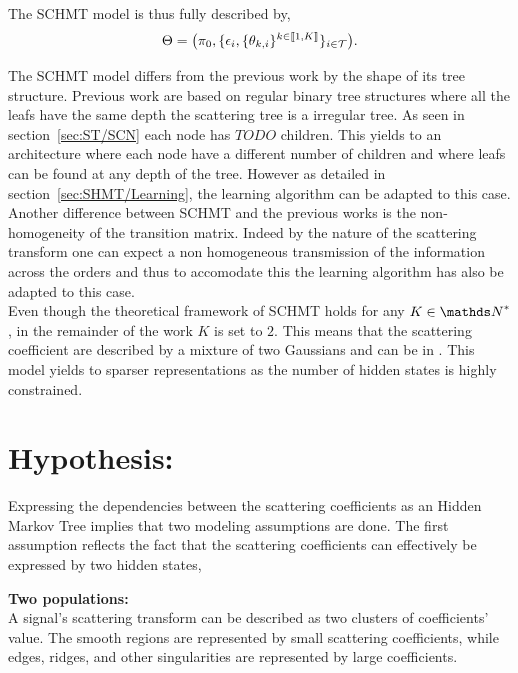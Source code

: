 \documentclass[a4paper,11pt]{report}
\begin{document}
{		The SCHMT model is thus fully described by,
		\begin{equation}
			\Theta = \big(\pi_{0}, \{ \epsilon_{i}, \{ \theta_{k,i} \}^{k\in\llbracket1,K\rrbracket} \}_{i\in\mathcal{T}}\big).
			\label{eq:SCHMT - parameters}
		\end{equation}
		
		
    The SCHMT model differs from the previous work by the shape of its tree structure. Previous work are based on regular binary tree structures where all the leafs have the same depth the scattering tree is a irregular tree. As seen in section~\ref{sec:ST/SCN} each node has $TODO$ children. This yields to an architecture where each node have a different number of children and where leafs can be found at any depth of the tree. However as detailed in section~\ref{sec:SHMT/Learning}, the learning algorithm can be adapted to this case. Another difference between SCHMT and the previous works is the non-homogeneity of the transition matrix. Indeed by the nature of the scattering transform one can expect a non homogeneous transmission of the information across the orders and thus to accomodate this the learning algorithm has also be adapted to this case.\\
    
    Even though the theoretical framework of SCHMT holds for any $K \in \dsN^{\ast}$, in the remainder of the work $K$ is set to $2$. This means that the scattering coefficient are described by a mixture of two Gaussians and can be in . This model yields to sparser representations as the number of hidden states is highly constrained.
    
    
  \section{Hypothesis:}
    \label{sec:SHMT/Hypos}
    
    Expressing the dependencies between the scattering coefficients as an Hidden Markov Tree implies that two modeling assumptions are done. The first assumption reflects the fact that the scattering coefficients can effectively be expressed by two hidden states,\\
    
    \begin{assumption}\textbf{Two populations:}\\
			A signal's scattering transform can be described as two clusters of coefficients' value. The smooth regions are represented by small scattering coefficients, while edges, ridges, and other singularities are represented by large coefficients.\\
			\label{assum:2pop}
    \end{assumption}
    
}
\end{document}
